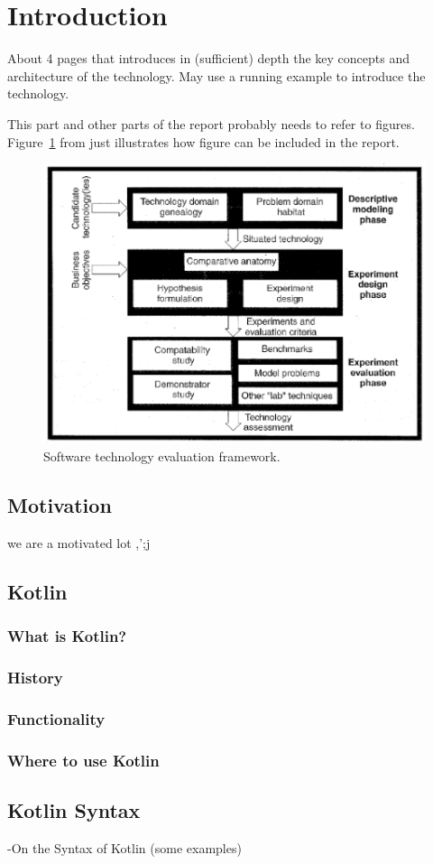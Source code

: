 \section{Introduction}
\label{sec:background}

About 4 pages that introduces in (sufficient) depth the key concepts
and architecture of the technology.  May use a running example to
introduce the technology.

This part and other parts of the report probably needs to refer to
figures. Figure~\ref{fig:framework} from \cite{brown:96} just
illustrates how figure can be included in the report.

\begin{figure}
  \centering
  \includegraphics[scale=0.5]{figs/framework.png}
  \caption{Software technology evaluation framework.}
  \label{fig:framework}
\end{figure}


\subsection{Motivation}
we are a motivated lot ,';j

\subsection{Kotlin}

\subsubsection{What is Kotlin?}
\subsubsection{History}
\subsubsection{Functionality}
\subsubsection{Where to use Kotlin}



\subsection{Kotlin Syntax}
 -On the Syntax of Kotlin (some examples)
 



